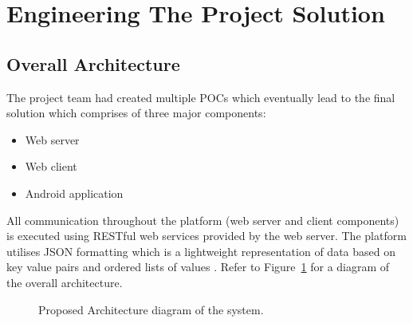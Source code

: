 \documentclass[12pt]{witseiepaper}
\begin{document}


\section{Engineering The Project Solution}




\subsection{Overall Architecture}
The project team had created multiple POCs which eventually lead to the final solution which comprises of three major components:
\begin{itemize}
\item Web server 
\item Web client
\item Android application
\end{itemize}

All communication throughout the platform (web server and client components) is executed using RESTful web services provided by the web server. The platform utilises JSON formatting which is a lightweight representation of data based on key value pairs and ordered lists of values \cite{JSON}. Refer to Figure~\ref{fig:Arch} for a diagram of the overall architecture.

\begin{figure}[H]
  \caption{Proposed Architecture diagram of the system.} 
  \label{fig:Arch}
\end{figure}
\end{document}
